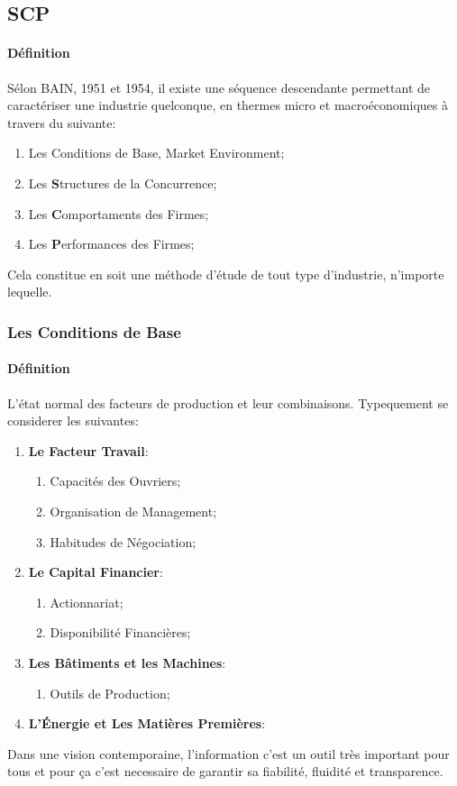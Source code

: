 \documentclass{article}
\begin{document}
\subsection{SCP}
\paragraph{Définition}Sélon BAIN, 1951 et 1954, il existe une séquence descendante permettant de caractériser une industrie  quelconque, en thermes micro et macroéconomiques à travers du suivante:
\begin{enumerate}[noitemsep]
    \item Les Conditions de Base, Market Environment;
    \item Les \textbf{S}tructures de la Concurrence;
    \item Les \textbf{C}omportaments des Firmes;
    \item Les \textbf{P}erformances des Firmes;
\end{enumerate}
Cela constitue en soit une méthode d'étude de tout type d'industrie, n'importe lequelle.

\subsubsection{Les Conditions de Base}
\paragraph{Définition}L'état normal des facteurs de production et leur combinaisons. Typequement se considerer les suivantes:
\begin{enumerate}
    \item \textbf{Le Facteur Travail}:
    \begin{enumerate}[noitemsep]
        \item Capacités des Ouvriers;
        \item Organisation de Management;
        \item Habitudes de Négociation;
    \end{enumerate}

    \item \textbf{Le Capital Financier}:
    \begin{enumerate}[noitemsep]
        \item Actionnariat;
        \item Disponibilité Financières;
    \end{enumerate}

    \item \textbf{Les Bâtiments et les Machines}:
    \begin{enumerate}[noitemsep]
        \item Outils de Production;
    \end{enumerate}

    \item \textbf{L'Énergie et Les Matières Premières}:
\end{enumerate}
Dans une vision contemporaine, l'information c'est un outil très important pour tous et pour ça c'est necessaire de garantir sa fiabilité, fluidité et transparence.
\end{document}
